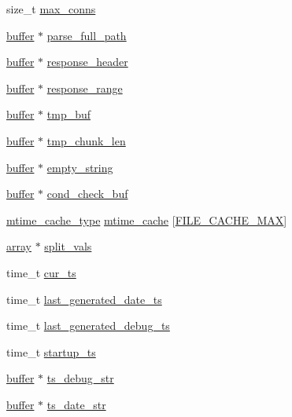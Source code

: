 \begin{DoxyCompactItemize}
\item 
size\-\_\-t \hyperlink{structserver_ae12b18e6b224508b0c180d05de909a1b}{max\-\_\-conns}
\item 
\hyperlink{structbuffer}{buffer} $\ast$ \hyperlink{structserver_a44af9c6606466641d97ae14d24c24fe7}{parse\-\_\-full\-\_\-path}
\item 
\hyperlink{structbuffer}{buffer} $\ast$ \hyperlink{structserver_a4127dbfb147505f2816e5871a86ae359}{response\-\_\-header}
\item 
\hyperlink{structbuffer}{buffer} $\ast$ \hyperlink{structserver_a06a78263bcf7d9f0b9a00e3fc5e508f5}{response\-\_\-range}
\item 
\hyperlink{structbuffer}{buffer} $\ast$ \hyperlink{structserver_aa23e0cfd582aff98760ee7b27ca0dcd2}{tmp\-\_\-buf}
\item 
\hyperlink{structbuffer}{buffer} $\ast$ \hyperlink{structserver_adfdf3be2489e78973d3eb0b0b946c067}{tmp\-\_\-chunk\-\_\-len}
\item 
\hyperlink{structbuffer}{buffer} $\ast$ \hyperlink{structserver_a4b15812620c84a776595b23c69926dc8}{empty\-\_\-string}
\item 
\hyperlink{structbuffer}{buffer} $\ast$ \hyperlink{structserver_a4f9bccd17cbfc67b09a83b5ed8b7999f}{cond\-\_\-check\-\_\-buf}
\item 
\hyperlink{structmtime__cache__type}{mtime\-\_\-cache\-\_\-type} \hyperlink{structserver_ad81dffe2cb285b67621f3ffb55b8012d}{mtime\-\_\-cache} \mbox{[}\hyperlink{settings_8h_acee552ba2dc0ad39359ef96792179f1c}{F\-I\-L\-E\-\_\-\-C\-A\-C\-H\-E\-\_\-\-M\-A\-X}\mbox{]}
\item 
\hyperlink{structarray}{array} $\ast$ \hyperlink{structserver_a3b9fc9aa87a4aad91d151c8639020418}{split\-\_\-vals}
\item 
time\-\_\-t \hyperlink{structserver_a04e46e7d58c9baa7cb27893c8f230ac7}{cur\-\_\-ts}
\item 
time\-\_\-t \hyperlink{structserver_aa496454b890b5139ef460be1834b8008}{last\-\_\-generated\-\_\-date\-\_\-ts}
\item 
time\-\_\-t \hyperlink{structserver_a538c428e737fc2eefca26c07bc1b18ff}{last\-\_\-generated\-\_\-debug\-\_\-ts}
\item 
time\-\_\-t \hyperlink{structserver_aed83f71d35709f7585b17127be8dd175}{startup\-\_\-ts}
\item 
\hyperlink{structbuffer}{buffer} $\ast$ \hyperlink{structserver_a0c7533cfeef213bb4e72350333ea8a1b}{ts\-\_\-debug\-\_\-str}
\item 
\hyperlink{structbuffer}{buffer} $\ast$ \hyperlink{structserver_a5395841d01eacd0b3732cf21141d11ea}{ts\-\_\-date\-\_\-str}

\end{DoxyCompactItemize}
